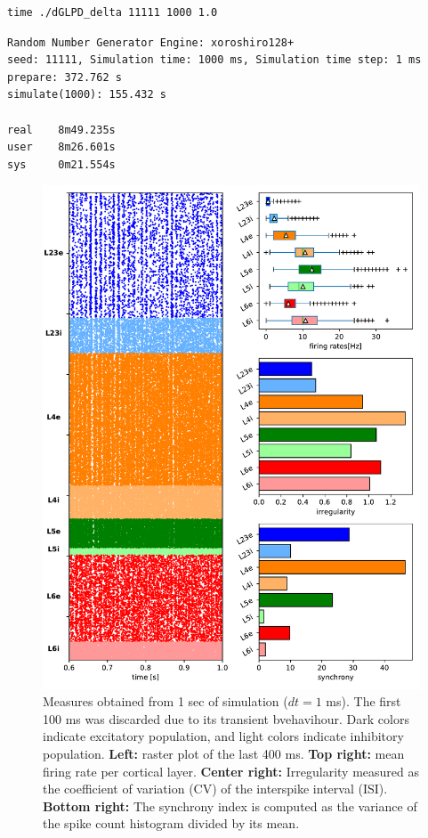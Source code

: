 \documentclass[11pt]{scrartcl}
\begin{document}
\begin{verbatim}
time ./dGLPD_delta 11111 1000 1.0
\end{verbatim}

\begin{verbatim}
Random Number Generator Engine: xoroshiro128+
seed: 11111, Simulation time: 1000 ms, Simulation time step: 1 ms
prepare: 372.762 s
simulate(1000): 155.432 s

real    8m49.235s
user    8m26.601s
sys     0m21.554s
\end{verbatim}

\begin{figure}[htbp]
\centering
\includegraphics[width=.9\linewidth]{./figures/dGLPD_delta_d1_1s.pdf}
\caption[\textbf{Bottom right:}]{\label{fig:org46f253a}Measures obtained from 1 sec of simulation (\(dt=1\) ms). The first 100 ms was discarded due to its transient bvehavihour. Dark colors indicate excitatory population, and light colors indicate inhibitory population. \textbf{Left:} raster plot of the last 400 ms. \textbf{Top right:} mean firing rate per cortical layer. \textbf{Center right:} Irregularity measured as the coefficient of variation (CV) of the interspike interval (ISI). \textbf{Bottom right:} The synchrony index is computed as the variance of the spike count histogram divided by its mean.}
\end{figure}
\end{document}
